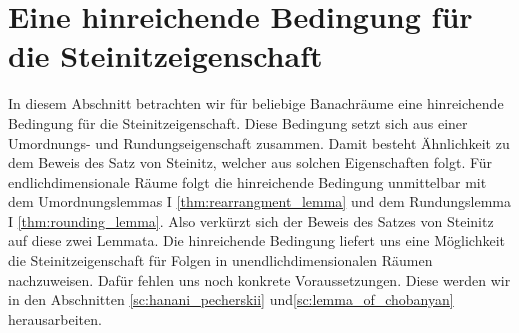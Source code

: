 \section{Eine hinreichende Bedingung für die Steinitzeigenschaft}
In diesem Abschnitt betrachten wir für beliebige Banachräume eine hinreichende Bedingung für die Steinitzeigenschaft.
Diese Bedingung setzt sich aus einer Umordnungs- und Rundungseigenschaft zusammen.
Damit besteht Ähnlichkeit zu dem Beweis des Satz von Steinitz, welcher aus solchen Eigenschaften folgt.
Für endlichdimensionale Räume folgt die hinreichende Bedingung unmittelbar mit dem Umordnungslemmas I \ref{thm:rearrangment_lemma} und dem Rundungslemma I \ref{thm:rounding_lemma}.
Also verkürzt sich der Beweis des Satzes von Steinitz auf diese zwei Lemmata.  
Die hinreichende Bedingung liefert uns eine Möglichkeit die Steinitzeigenschaft für Folgen in unendlichdimensionalen Räumen nachzuweisen.
Dafür fehlen uns noch konkrete Voraussetzungen.
Diese werden wir in den Abschnitten \ref{sc:hanani_pecherskii} und\ref{sc:lemma_of_chobanyan} herausarbeiten.


